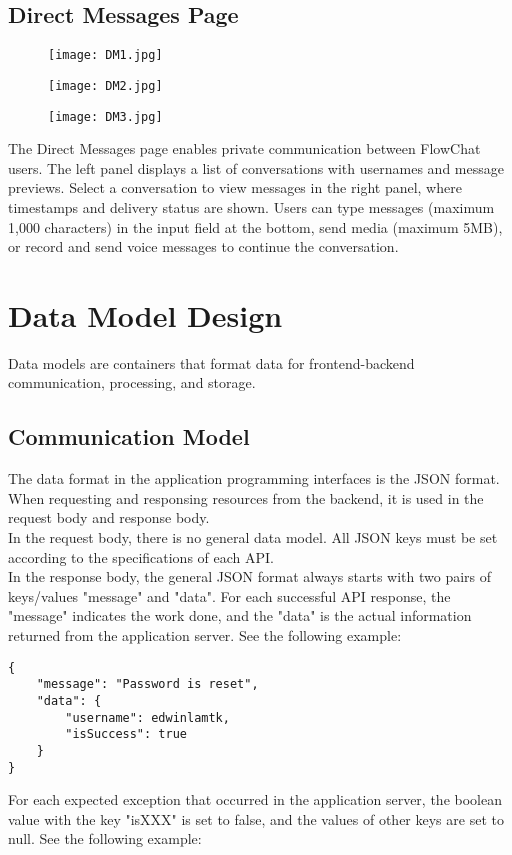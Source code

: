 \documentclass[11pt, a4paper]{article}
\begin{document}
\subsection{Direct Messages Page}
\begin{figure}[H]
    \centering
    \texttt{[image: DM1.jpg]}
    \label{fig:DM_Page}
\end{figure}
\begin{figure}[H]
    \centering
    \texttt{[image: DM2.jpg]}
    \label{fig:DM_Page}
\end{figure}
\begin{figure}[H]
    \centering
    \texttt{[image: DM3.jpg]}
    \label{fig:DM_Page}
\end{figure}
The Direct Messages page enables private communication between FlowChat users. The left panel displays a list of conversations with usernames and message previews. Select a conversation to view messages in the right panel, where timestamps and delivery status are shown. Users can type messages (maximum 1,000 characters) in the input field at the bottom, send media (maximum 5MB), or record and send voice messages to continue the conversation.

\section{Data Model Design}
Data models are containers that format data for frontend-backend communication, processing, and storage.

\subsection{Communication Model}
The data format in the application programming interfaces is the JSON format. When requesting and responsing resources from the backend, it is used in the request body and response body. \\

In the request body, there is no general data model. All JSON keys must be set according to the specifications of each API. \\

In the response body, the general JSON format always starts with two pairs of keys/values "message" and "data". For each successful API response, the "message" indicates the work done, and the "data" is the actual information returned from the application server. See the following example: 

\begin{lstlisting}[breaklines=true, frame=single]
{
    "message": "Password is reset",
    "data": {
        "username": edwinlamtk,
        "isSuccess": true
    }
}
\end{lstlisting}
\smallskip
For each expected exception that occurred in the application server, the boolean value with the key "isXXX" is set to false, and the values of other keys are set to null. See the following example: 
\end{document}
